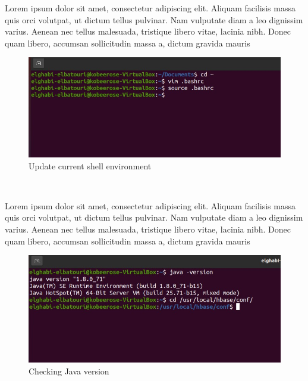\begin{spacing}{1.2}
\par Lorem ipsum dolor sit amet, consectetur adipiscing elit. Aliquam facilisis massa quis orci volutpat, ut dictum tellus pulvinar. Nam vulputate diam a leo dignissim varius. Aenean nec tellus malesuada, tristique libero vitae, lacinia nibh. Donec quam libero, accumsan sollicitudin massa a, dictum gravida mauris
\\
\begin{figure}[!htb] 
\begin{center} 
\includegraphics[width=1\linewidth]{Pictures/HBase/Configuring Hbase in Standalone & Pseudo-distributed mode/Installing and Configuring Apache Hbase/Update current shell environment} 
\end{center} 
\caption{Update current shell environment} 
\end{figure}  \FloatBarrier
\\

\par Lorem ipsum dolor sit amet, consectetur adipiscing elit. Aliquam facilisis massa quis orci volutpat, ut dictum tellus pulvinar. Nam vulputate diam a leo dignissim varius. Aenean nec tellus malesuada, tristique libero vitae, lacinia nibh. Donec quam libero, accumsan sollicitudin massa a, dictum gravida mauris
\\
\begin{figure}[!htb] 
\begin{center} 
\includegraphics[width=1\linewidth]{Pictures/HBase/Configuring Hbase in Standalone & Pseudo-distributed mode/Installing and Configuring Apache Hbase/Checking Java version} 
\end{center} 
\caption{Checking Java version} 
\end{figure}  \FloatBarrier
\\


\end{spacing}
